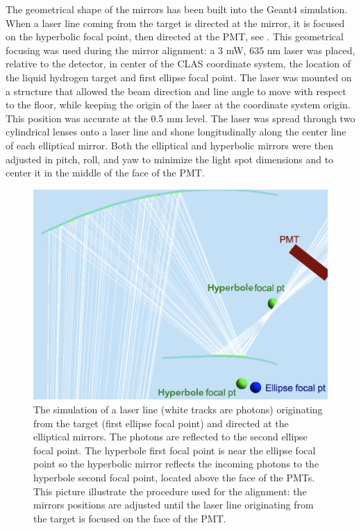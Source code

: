 The geometrical shape of the mirrors has been built into the Geant4 simulation. When a laser line coming from the target is directed at the mirror,
it is focused on the hyperbolic focal point, then directed at the PMT, see .
This geometrical focusing was used during the mirror alignment: a 3 mW, 635 nm laser was placed, relative to the detector,
in center of the CLAS coordinate system, the location of the liquid hydrogen target and first ellipse focal point.
The laser was mounted on a structure that allowed the beam direction and line angle to move with respect to the floor, while keeping
the origin of the laser at the coordinate system origin.
This position was accurate at the 0.5 mm level. The laser was spread through two cylindrical lenses onto a laser line and shone
longitudinally along the center line of each elliptical mirror. Both the elliptical and hyperbolic mirrors were then adjusted in pitch, roll, and yaw to minimize the light spot
dimensions and to center it in the middle of the face of the PMT.


\begin{figure}[hb]
\centering
	\includegraphics[width=0.95\columnwidth, keepaspectratio]{img/mirrorAlignmentSimulationZoomed.png}
	\caption{The simulation of a laser line (white tracks are photons) originating from the target (first ellipse focal point) and directed at the elliptical mirrors.
            The photons are reflected to the second ellipse focal point. The hyperbole first focal point is near the ellipse focal point so the hyperbolic mirror
			   reflects the incoming photons to the hyperbole second focal point, located above the face of the PMTs.
			   This picture illustrate the procedure used for the alignment: the mirrors positions are adjusted until the laser line originating from
				the target is focused on the face of the PMT.}
	\label{fig:alignmentSimulation}
\end{figure}


